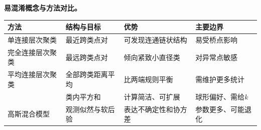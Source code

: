 \begin{comparisonbox}
\textbf{易混淆概念与方法对比。}\par\smallskip
\begingroup
\footnotesize
\renewcommand{\arraystretch}{0.92}
\begin{tabularx}{\linewidth}{@{}l X X X@{}}
\toprule 方法 & 结构与目标 & 优势 & 主要边界\\ \midrule
单连接层次聚类 & 最近跨类点对 & 可发现连通链状结构 & 易受桥点影响\\
完全连接层次聚类 & 最远跨类点对 & 倾向紧致小直径类 & 对异常点敏感\\
平均连接层次聚类 & 全部跨类距离平均 & 比两端规则平衡 & 需维护更多统计\\
\kMeans{} & 类内平方和 & 计算简洁、可扩展 & 球形偏好、需给$k$\\
高斯混合模型 & 观测似然与软后验 & 表达不确定性和协方差 & 参数更多、可能退化\\
\bottomrule
\end{tabularx}
\endgroup
\end{comparisonbox}

